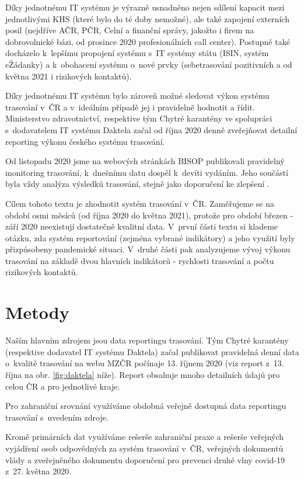 Díky jednotnému IT systému je výrazně usnadněno nejen sdílení kapacit mezi jednotlivými KHS (které bylo do té doby nemožné), ale také zapojení externích posil (nejdříve AČR, PČR, Celní a finanční správy, jakožto i firem na dobrovolnické bázi, od prosince 2020 profesionálních call center). Postupně také docházelo k~lepšímu propojení systému s~IT systémy státu (ISIN, systém eŽádanky) a k~obohacení systému o~nové prvky (sebetrasování pozitivních a od května 2021 i rizikových kontaktů).

Díky jednotnému IT systému bylo zároveň možné sledovat výkon systému trasování v~ČR a v~ideálním případě jej i pravidelně hodnotit a řídit. Ministerstvo zdravotnictví, respektive tým Chytré karantény ve spolupráci s~dodavatelem IT systému Daktela začal od října 2020 denně zveřejňovat detailní reporting výkonu českého systému trasování.

Od listopadu 2020 jsme na webových stránkách BISOP publikovali pravidelný monitoring trasování, k~dnešnímu datu dospěl k~devíti vydáním. Jeho součástí byla vždy analýza výsledků trasování, stejně jako doporučení ke zlepšení \cite{tr_bisop07}. 

Cílem tohoto textu je zhodnotit systém trasování v~ČR. Zaměřujeme se na období osmi měsíců (od října 2020 do května 2021), protože pro období březen - září 2020 neexistují dostatečně kvalitní data. V~první části textu si klademe otázku, zda systém reportování (zejména vybrané indikátory) a jeho využití byly přizpůsobeny pandemické situaci. V~druhé části pak analyzujeme vývoj výkonu trasování na základě dvou hlavních indikátorů - rychlosti trasování a počtu rizikových kontaktů.

\section*{Metody}

Naším hlavním zdrojem jsou data reportingu trasování. Tým Chytré karantény (respektive dodavatel IT systému Daktela) začal publikovat pravidelná denní data o~kvalitě trasování na webu MZČR počínaje 13. říjnem 2020 (viz report z~13. října na obr. \ref{fig:daktela} níže). Report obsahuje mnoho detailních údajů pro celou ČR a pro jednotlivé kraje.

Pro zahraniční srovnání využíváme obdobná veřejně dostupná data reportingu trasování s~uvedením zdroje.

Kromě primárních dat využíváme rešerše zahraniční praxe a rešerše veřejných vyjádření osob odpovědných za systém trasování v~ČR, veřejných dokumentů vlády a zveřejněného dokumentu doporučení pro prevenci druhé vlny covid-19 z~27. května 2020.


